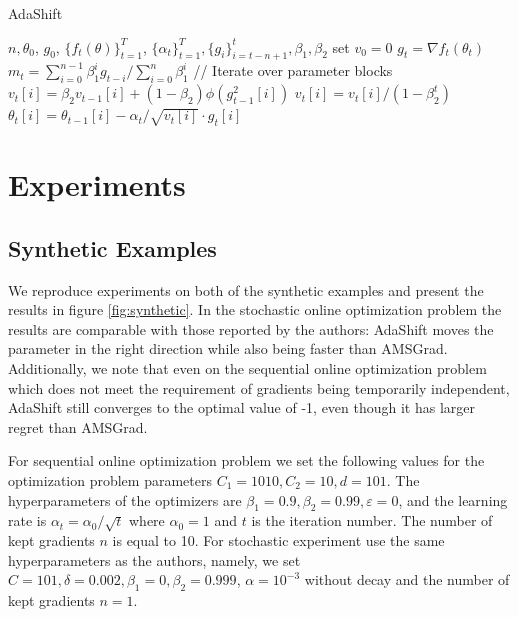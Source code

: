 \documentclass{article} %
\begin{document}
\begin{algorithm}[t]
	\caption{AdaShift \citep{zhou2018adashift}}
	\label{alg:adashift}
	\begin{algorithmic}[1]
		\REQUIRE $n,\theta_0$, $g_0$, $\{f_t(\theta)\}^T_{t=1}$, $\{\alpha_t\}^T_{t=1}, \{g_i\}_{i=t-n + 1}^t, \beta_1, \beta_2$
		\STATE set $ v_0=0 $
	        \STATE $g_t = \nabla f_t(\theta_t)$
	        \STATE $m_t = \sum_{i=0}^{n - 1} \beta_1^i g_{t-i}/
	        \sum_{i = 0}^n\beta_1^i$
	        \STATE // Iterate over parameter blocks
        		\STATE $v_{t}[i] = \beta_2v_{t-1}[i] + (1-\beta_2)\phi(g^2_{t-1}[i])$
        		\STATE $v_t[i] = v_t[i] / (1 - \beta_2^t)$
        		\STATE $\theta_{t}[i]=\theta_{t-1}[i]- \alpha_t/\sqrt{v_{t}[i]} \cdot g_{t}[i]$
    		\ENDFOR
		\ENDFOR
	\end{algorithmic}
\end{algorithm}

\section{Experiments}
\subsection{Synthetic Examples}

We reproduce experiments on both of the synthetic examples and present the results in figure \ref{fig:synthetic}. In the stochastic online optimization problem the results
are comparable with those reported by the
authors: AdaShift moves the parameter in the right direction while also being faster than AMSGrad. Additionally, we note that
even on the sequential online optimization problem which
does not meet the requirement of gradients being temporarily
independent, AdaShift still converges to the optimal value of -1, even though it has larger regret than AMSGrad.

For sequential online optimization problem we set
the following values for the optimization problem parameters
$C_1 = 1010, C_2 = 10, d = 101$. The hyperparameters of the optimizers are  $\beta_1 = 0.9, \beta_2 = 0.99, \varepsilon = 0$, and the learning rate is
$\alpha_t = \alpha_0/\sqrt{t}$ where $\alpha_0=1$ and
$t$ is the iteration number. The number of kept gradients
$n$ is equal to 10. For stochastic
experiment use the same hyperparameters as the authors, namely, we set $C = 101, \delta = 0.002, \beta_1 = 0,
\beta_2 = 0.999$, $\alpha=10^{-3}$ without decay and
the number of kept gradients $n = 1$.
\end{document}

